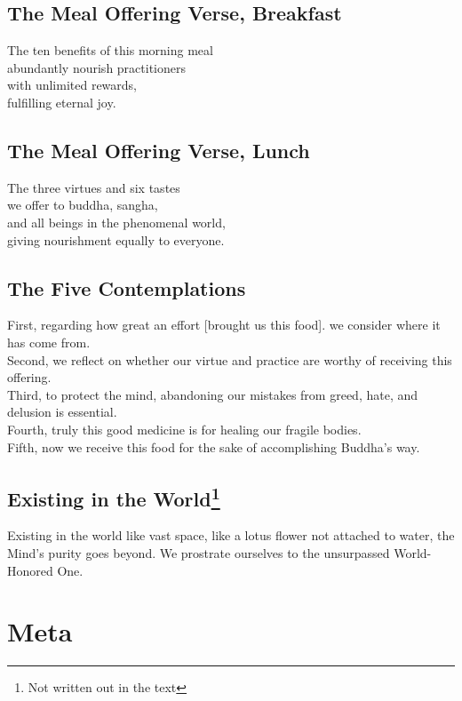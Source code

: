 \documentclass{article}
\begin{document}
\begin{multicols}{2}
\subsection{The Meal Offering Verse, Breakfast}

The ten benefits of this morning meal\\
abundantly nourish practitioners\\
with unlimited rewards,\\
fulfilling eternal joy.

\subsection{The Meal Offering Verse, Lunch}

The three virtues and six tastes\\
we offer to buddha, sangha,\\
and all beings in the phenomenal world,\\
giving nourishment equally to everyone.

\subsection{The Five Contemplations}

First, regarding how great an effort [brought us this food]. we consider where it has come from.\\
Second, we reflect on whether our virtue and practice are worthy of receiving this offering.\\
Third, to protect the mind, abandoning our mistakes from greed, hate, and delusion is essential.\\
Fourth, truly this good medicine is for healing our fragile bodies.\\
Fifth, now we receive this food for the sake of accomplishing Buddha's way.

\subsection{Existing in the World\protect\footnote{Not written out in the text}}

Existing in the world like vast space, like a lotus flower not attached
to water, the Mind's purity goes beyond. We prostrate ourselves to the
unsurpassed World-Honored One.

\section{Meta}


\end{multicols}
\end{document}
